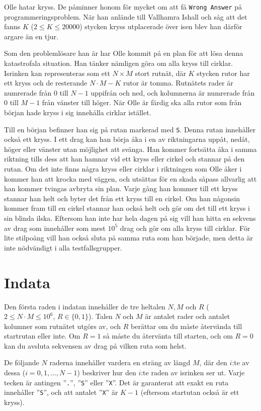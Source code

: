 \noindent
Olle hatar kryss. De påminner honom för mycket om att få \texttt{Wrong Answer} på programmeringsproblem. 
När han anlände till Vallhamra Ishall
och såg att det fanns $K$ ($2 \leq K \leq 20000$) stycken kryss utplacerade över isen blev han därför argare än en tjur.

Som den problemlösare han är har Olle kommit på en plan för att lösa denna katastrofala situation. 
Han tänker nämligen göra om alla kryss till cirklar.
Isrinken kan representeras
som ett $N \times M$ stort rutnät, där $K$ stycken rutor har ett kryss och de resterande $N \cdot M - K$ rutor är tomma.
Rutnätets rader är numrerade från $0$ till $N-1$ uppifrån och ned, och kolumnerna är numrerade från $0$ till $M-1$ från vänster till höger.
När Olle är färdig ska alla rutor som från början hade kryss i sig innehålla cirklar istället.

Till en början befinner han sig på rutan markerad med \texttt{S}. 
Denna rutan innehåller också ett kryss. 
I ett drag kan han börja åka i en av riktningarna uppåt, nedåt, höger eller vänster utan möjlighet att svänga. 
Han kommer fortsätta åka i samma riktning tills dess att han
hamnar vid ett kryss eller cirkel och stannar på den rutan.
Om det inte finns några kryss eller cirklar i riktningen som Olle åker i
kommer han att krocka med väggen, och utsättas för en skada såpass allvarlig
att han kommer tvingas avbryta sin plan. 
Varje gång han kommer till ett kryss stannar han helt och byter det från ett kryss till en cirkel.
Om han någonsin kommer fram till en cirkel stannar han också helt och gör om det till ett kryss i sin blinda ilska. 
Eftersom han inte har hela dagen
på sig vill han hitta en sekvens av drag som innehåller som mest \textbf{$10^5$} drag och gör om alla kryss till cirklar. 
För lite stilpoäng vill han
också sluta på samma ruta som han började, men detta är inte nödvändigt i alla testfallsgrupper.

\section*{Indata}
Den första raden i indatan innehåller de tre heltalen $N,M$ och $R$ ($2 \le N \cdot M \leq 10^6$, $R \in \{0,1\}$).
Talen $N$ och $M$ är antalet rader
och antalet kolumner som rutnätet utgörs av, 
och $R$ berättar om du måste återvända till startrutan eller inte.
Om $R = 1$ så måste du återvänta till starten, och om $R = 0$
kan du avsluta sekvensen av drag på vilken ruta som helst.

De följande $N$ raderna innehåller vardera en sträng av längd $M$, 
där den $i$:te av dessa ($i = 0, 1, \dots, N-1$) beskriver hur den $i$:te raden av isrinken ser ut.
Varje tecken är antingen ''\texttt{.}'', ''\texttt{S}'' eller ''\texttt{X}''. 
Det är garanterat att exakt en ruta innehåller 
''\texttt{S}'', och att antalet ''\texttt{X}'' är $K - 1$ (eftersom startutan också är ett kryss).

